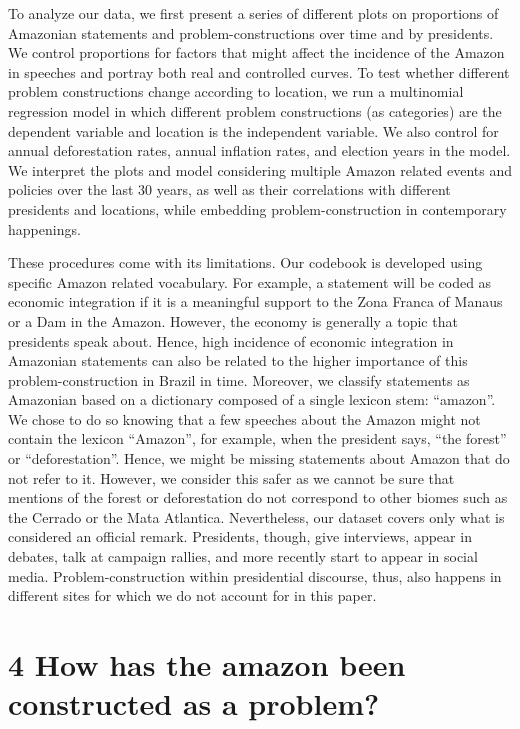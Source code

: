 \documentclass[
]{article}
\begin{document}
To analyze our data, we first present a series of different plots on
proportions of Amazonian statements and problem-constructions over time
and by presidents. We control proportions for factors that might affect
the incidence of the Amazon in speeches and portray both real and
controlled curves. To test whether different problem constructions
change according to location, we run a multinomial regression model in
which different problem constructions (as categories) are the dependent
variable and location is the independent variable. We also control for
annual deforestation rates, annual inflation rates, and election years
in the model. We interpret the plots and model considering multiple
Amazon related events and policies over the last 30 years, as well as
their correlations with different presidents and locations, while
embedding problem-construction in contemporary happenings.

These procedures come with its limitations. Our codebook is developed
using specific Amazon related vocabulary. For example, a statement will
be coded as economic integration if it is a meaningful support to the
Zona Franca of Manaus or a Dam in the Amazon. However, the economy is
generally a topic that presidents speak about. Hence, high incidence of
economic integration in Amazonian statements can also be related to the
higher importance of this problem-construction in Brazil in time.
Moreover, we classify statements as Amazonian based on a dictionary
composed of a single lexicon stem: ``amazon''. We chose to do so knowing
that a few speeches about the Amazon might not contain the lexicon
``Amazon'', for example, when the president says, ``the forest'' or
``deforestation''. Hence, we might be missing statements about Amazon
that do not refer to it. However, we consider this safer as we cannot be
sure that mentions of the forest or deforestation do not correspond to
other biomes such as the Cerrado or the Mata Atlantica. Nevertheless,
our dataset covers only what is considered an official remark.
Presidents, though, give interviews, appear in debates, talk at campaign
rallies, and more recently start to appear in social media.
Problem-construction within presidential discourse, thus, also happens
in different sites for which we do not account for in this paper.

\hypertarget{how-has-the-amazon-been-constructed-as-a-problem}{%
\section{4 How has the amazon been constructed as a
problem?}\label{how-has-the-amazon-been-constructed-as-a-problem}}
\end{document}
